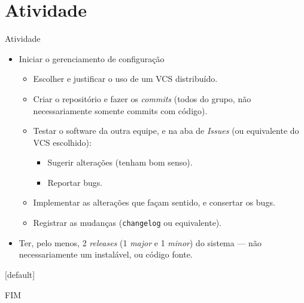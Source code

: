 \documentclass{beamer}
\begin{document}
\section{Atividade}

\begin{frame}{Atividade}
    \begin{itemize}
        \justifying
        \item Iniciar o gerenciamento de configuração
        	\begin{itemize}
        		\justifying
        		\item Escolher e justificar o uso de um VCS distribuído.
        		\item Criar o repositório e fazer os \textit{commits} (todos do grupo, não necessariamente somente commits com código).
        		\item Testar o software da outra equipe, e na aba de \textit{Issues} (ou equivalente do VCS escolhido):
        			\begin{itemize}
        				\item Sugerir alterações (tenham bom senso).
        				\item Reportar bugs.
        			\end{itemize}
        		\item Implementar as alterações que façam sentido, e consertar os bugs.
        		\item Registrar as mudanças (\texttt{changelog} ou equivalente).
        	\end{itemize}
        \item Ter, pelo menos, 2 \textit{releases} (1 \textit{major} e 1 \textit{minor}) do sistema --- não necessariamente um instalável, ou código fonte.
    \end{itemize}
\end{frame}

[default]



\begin{frame}
    \centering
    \Large
    FIM
\end{frame}
    
\end{document}
